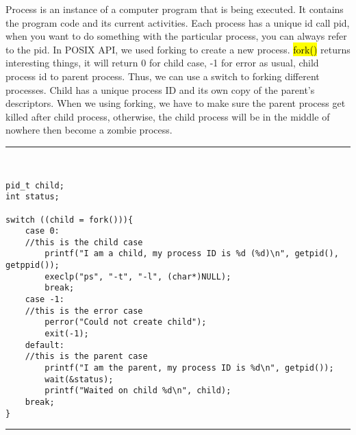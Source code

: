 \documentclass[10pt,draftclsnofoot,onecolumn,journal,compsoc]{IEEEtran}
\begin{document}
Process is an instance of a computer program that is being executed. It contains the program code and its current activities. Each process has a unique id call pid, when you want to do something with the particular process, you can always refer to the pid. In POSIX API, we used forking to create a new process. \hl{fork()} returns interesting things, it will return 0 for child case, -1 for error as usual, child process id to parent process. Thus, we can use a switch to forking different processes. Child has a unique process ID and its own copy of the parent's descriptors. When we using forking, we have to make sure the parent process get killed after child process, otherwise, the child process will be in the middle of nowhere then become a zombie process.\par
\noindent\rule{15.5cm}{0.4pt}
\\
\begin{verbatim}
pid_t child; 
int status; 
	 
switch ((child = fork())){ 
    case 0: 
    //this is the child case 
        printf("I am a child, my process ID is %d (%d)\n", getpid(), getppid()); 
        execlp("ps", "-t", "-l", (char*)NULL); 
        break; 
    case -1: 
    //this is the error case 
        perror("Could not create child"); 
        exit(-1); 
    default: 
    //this is the parent case 
        printf("I am the parent, my process ID is %d\n", getpid()); 
        wait(&status); 
        printf("Waited on child %d\n", child); 
    break; 
} 
\end{verbatim}
\noindent\rule{15.5cm}{0.4pt}\\
\end{document}

